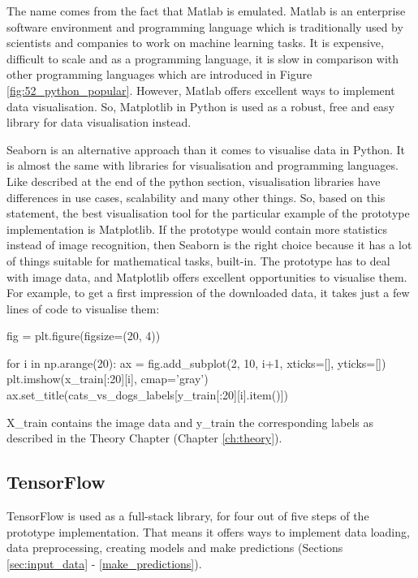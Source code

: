 The name comes from the fact that Matlab is emulated.  Matlab is an enterprise software environment and programming language which is traditionally used by scientists and companies to work on machine learning tasks. It is expensive, difficult to scale and as a programming language, it is slow in comparison with other programming languages which are introduced in Figure \ref{fig:52_python_popular}. However, Matlab offers excellent ways to implement data visualisation. So, Matplotlib in Python is used as a robust, free and easy library for data visualisation instead. 

Seaborn is an alternative approach than it comes to visualise data in Python. It is almost the same with libraries for visualisation and programming languages. Like described at the end of the python section, visualisation libraries have differences in use cases, scalability and many other things. So, based on this statement, the best visualisation tool for the particular example of the prototype implementation is Matplotlib. If the prototype would contain more statistics instead of image recognition, then Seaborn is the right choice because it has a lot of things suitable for mathematical tasks, built-in. The prototype has to deal with image data, and Matplotlib offers excellent opportunities to visualise them. For example, to get a first impression of the downloaded data, it takes just a few lines of code to visualise them: 

\begin{python}[label={pred}, caption={Predictions of the pre-trained VGG16 Architecture CNN model}]
	fig = plt.figure(figsize=(20, 4))
	
	for i in np.arange(20):
	ax = fig.add_subplot(2, 10, i+1, xticks=[], yticks=[])
	plt.imshow(x_train[:20][i], cmap='gray')
	ax.set_title(cats_vs_dogs_labels[y_train[:20][i].item()])
\end{python}

X\_train contains the image data and y\_train the corresponding labels as described in the Theory Chapter (Chapter \ref{ch:theory}).

\subsection{TensorFlow} 

TensorFlow is used as a full-stack library, for four out of five steps of the prototype implementation. That means it offers ways to implement data loading, data preprocessing, creating models and make predictions (Sections \ref{sec:input_data} - \ref{make_predictions}). 

